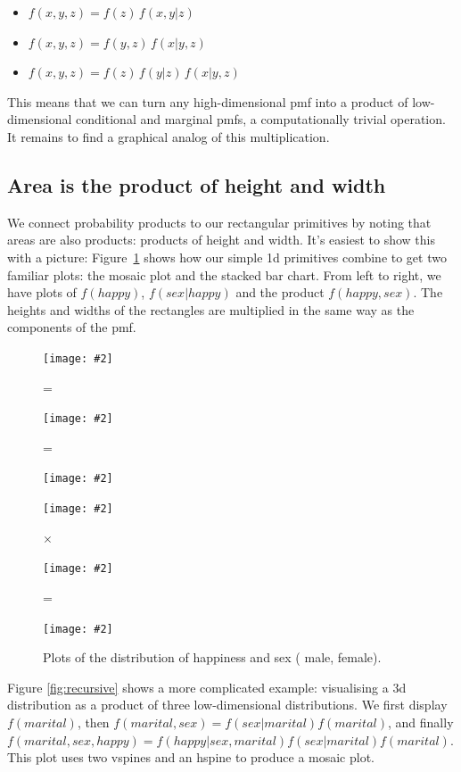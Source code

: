 \documentclass[journal]{vgtc}
\newcommand{\key}[1]
  {\protect \tikz{\fill[#1] rectangle (1ex,1ex);}}
\newcommand{\includegraphicsinline}[2]{\begin{minipage}{#1}\texttt{[image: \#2]}\end{minipage}}
\begin{document}
\begin{itemize}
  \setlength{\itemsep}{0em}
  \item $f(x, y, z) = f(z)\,f(x, y | z)$
  \item $f(x, y, z) = f(y, z)\,f(x | y, z) $
  \item $f(x, y, z) = f(z)\,f(y | z)\,f(x | y, z)$
\end{itemize}


This means that we can turn any high-dimensional {\sc pmf} into a product of low-dimensional conditional and marginal {\sc pmf}s, a computationally trivial operation. It remains to find a graphical analog of this multiplication. 

\subsection{Area is the product of height and width}

We connect probability products to our rectangular primitives by noting that areas are also products: products of height and width. It's easiest to show this with a picture: Figure~\ref{fig:fact-simple} shows how our simple 1d primitives combine to get two familiar plots: the mosaic plot and the stacked bar chart. From left to right, we have plots of $f(happy)$, $f(sex | happy)$ and the product $f(happy, sex)$. The heights and widths of the rectangles are multiplied in the same way as the components of the {\sc pmf}.

\begin{figure}[htbp]
  \centering
  \includegraphicsinline{0.3\linewidth}{fact-happy} = %
  \includegraphicsinline{0.3\linewidth}{fact-happy|sex} = %
  \includegraphicsinline{0.3\linewidth}{fact-happy-sex}

  \includegraphicsinline{0.3\linewidth}{fact-happy-2} $\times$ %
  \includegraphicsinline{0.3\linewidth}{fact-happy|sex-2} = %
  \includegraphicsinline{0.3\linewidth}{fact-happy-sex-2}

  \caption{Plots of the distribution of happiness and sex (\key{male} male, \key{female} female).}
  \label{fig:fact-simple}
\end{figure}

Figure \ref{fig:recursive} shows a more complicated example: visualising a 3d distribution as a product of three low-dimensional distributions. We first display $f(marital)$, then $f(marital, sex) = f(sex | marital) f(marital)$, and finally $f(marital, sex, happy) = f(happy | sex, marital) f(sex | marital) f(marital)$. This plot uses two vspines and an hspine to produce a mosaic plot.
\end{document}
